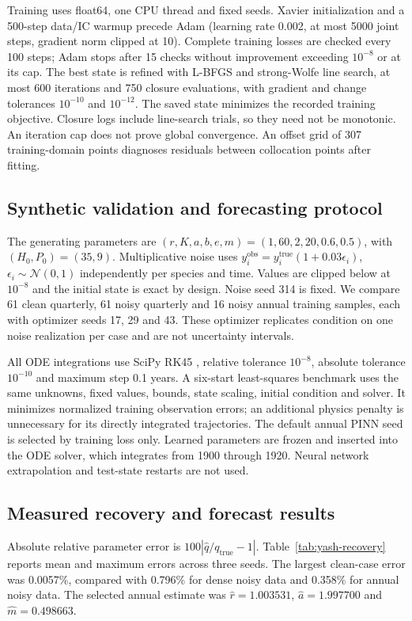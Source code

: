 Training uses float64, one CPU thread and fixed seeds. Xavier initialization and a
500-step data/IC warmup precede Adam (learning rate 0.002, at most 5000 joint steps,
gradient norm clipped at 10). Complete training losses are checked every 100 steps;
Adam stops after 15 checks without improvement exceeding $10^{-8}$ or at its cap.
The best state is refined with L-BFGS and strong-Wolfe line search, at most 600 iterations
and 750 closure evaluations, with gradient and change tolerances $10^{-10}$ and
$10^{-12}$. The saved state minimizes the recorded training objective. Closure logs
include line-search trials, so they need not be monotonic. An iteration cap does not
prove global convergence. An offset grid of 307 training-domain points diagnoses
residuals between collocation points after fitting.

\subsection{Synthetic validation and forecasting protocol}
The generating parameters are $(r,K,a,b,e,m)=(1,60,2,20,0.6,0.5)$, with
$(H_0,P_0)=(35,9)$. Multiplicative noise uses
$y_i^{\mathrm{obs}}=y_i^{\mathrm{true}}(1+0.03\epsilon_i)$,
$\epsilon_i\sim\mathcal N(0,1)$ independently per species and time. Values are clipped
below at $10^{-8}$ and the initial state is exact by design. Noise seed 314 is fixed.
We compare 61 clean quarterly, 61 noisy quarterly and 16 noisy annual training samples,
each with optimizer seeds 17, 29 and 43. These optimizer replicates condition on one
noise realization per case and are not uncertainty intervals.

All ODE integrations use SciPy RK45 \cite{scipysolve}, relative tolerance $10^{-8}$,
absolute tolerance $10^{-10}$ and maximum step 0.1 years. A six-start least-squares
benchmark uses the same unknowns, fixed values, bounds, state scaling, initial condition
and solver. It minimizes normalized training observation errors; an additional physics
penalty is unnecessary for its directly integrated trajectories. The default annual
PINN seed is selected by training loss only. Learned parameters are frozen and inserted
into the ODE solver, which integrates from 1900 through 1920. Neural network
extrapolation and test-state restarts are not used.

\subsection{Measured recovery and forecast results}
Absolute relative parameter error is $100|\widehat q/q_{\mathrm{true}}-1|$.
Table~\ref{tab:yash-recovery} reports mean and maximum errors across three seeds.
The largest clean-case error was 0.0057\%, compared with 0.796\% for dense noisy data and 0.358\% for annual noisy data. The selected annual estimate was $\widehat r=1.003531$, $\widehat a=1.997700$ and $\widehat m=0.498663$.

